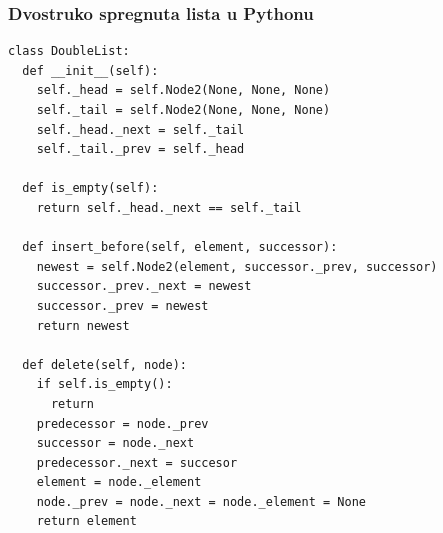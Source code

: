 \documentclass[compress,aspectratio=169]{beamer}
\begin{document}
\begin{frame}
  \frametitle{Dvostruko spregnuta lista u Pythonu}
\begin{verbatim}
class DoubleList:
  def __init__(self):
    self._head = self.Node2(None, None, None)
    self._tail = self.Node2(None, None, None)
    self._head._next = self._tail
    self._tail._prev = self._head

  def is_empty(self):
    return self._head._next == self._tail
    
  def insert_before(self, element, successor):
    newest = self.Node2(element, successor._prev, successor)
    successor._prev._next = newest
    successor._prev = newest
    return newest
    
  def delete(self, node):
    if self.is_empty():
      return
    predecessor = node._prev
    successor = node._next
    predecessor._next = succesor
    element = node._element
    node._prev = node._next = node._element = None
    return element
\end{verbatim}
\end{frame}
\end{document}
